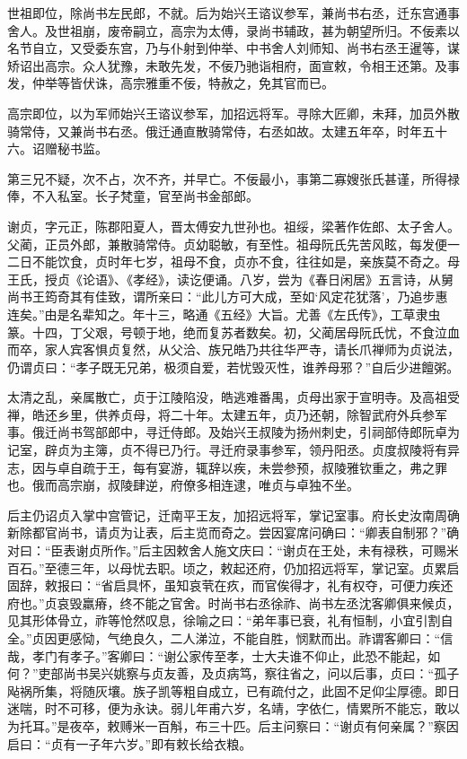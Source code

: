 \documentclass[]{article}
\begin{document}
世祖即位，除尚书左民郎，不就。后为始兴王谘议参军，兼尚书右丞，迁东宫通事舍人。及世祖崩，废帝嗣立，高宗为太傅，录尚书辅政，甚为朝望所归。不佞素以名节自立，又受委东宫，乃与仆射到仲举、中书舍人刘师知、尚书右丞王暹等，谋矫诏出高宗。众人犹豫，未敢先发，不佞乃驰诣相府，面宣敕，令相王还第。及事发，仲举等皆伏诛，高宗雅重不佞，特赦之，免其官而已。

高宗即位，以为军师始兴王谘议参军，加招远将军。寻除大匠卿，未拜，加员外散骑常侍，又兼尚书右丞。俄迁通直散骑常侍，右丞如故。太建五年卒，时年五十六。诏赠秘书监。

第三兄不疑，次不占，次不齐，并早亡。不佞最小，事第二寡嫂张氏甚谨，所得禄俸，不入私室。长子梵童，官至尚书金部郎。

谢贞，字元正，陈郡阳夏人，晋太傅安九世孙也。祖绥，梁著作佐郎、太子舍人。父蔺，正员外郎，兼散骑常侍。贞幼聪敏，有至性。祖母阮氏先苦风眩，每发便一二日不能饮食，贞时年七岁，祖母不食，贞亦不食，往往如是，亲族莫不奇之。母王氏，授贞《论语》、《孝经》，读讫便诵。八岁，尝为《春日闲居》五言诗，从舅尚书王筠奇其有佳致，谓所亲曰：``此儿方可大成，至如`风定花犹落'，乃追步惠连矣。''由是名辈知之。年十三，略通《五经》大旨。尤善《左氏传》，工草隶虫篆。十四，丁父艰，号顿于地，绝而复苏者数矣。初，父蔺居母阮氏忧，不食泣血而卒，家人宾客惧贞复然，从父洽、族兄皓乃共往华严寺，请长爪禅师为贞说法，仍谓贞曰：``孝子既无兄弟，极须自爱，若忧毁灭性，谁养母邪？''自后少进饘粥。

太清之乱，亲属散亡，贞于江陵陷没，皓逃难番禺，贞母出家于宣明寺。及高祖受禅，皓还乡里，供养贞母，将二十年。太建五年，贞乃还朝，除智武府外兵参军事。俄迁尚书驾部郎中，寻迁侍郎。及始兴王叔陵为扬州刺史，引祠部侍郎阮卓为记室，辟贞为主簿，贞不得已乃行。寻迁府录事参军，领丹阳丞。贞度叔陵将有异志，因与卓自疏于王，每有宴游，辄辞以疾，未尝参预，叔陵雅钦重之，弗之罪也。俄而高宗崩，叔陵肆逆，府僚多相连逮，唯贞与卓独不坐。

后主仍诏贞入掌中宫管记，迁南平王友，加招远将军，掌记室事。府长史汝南周确新除都官尚书，请贞为让表，后主览而奇之。尝因宴席问确曰：``卿表自制邪？''确对曰：``臣表谢贞所作。''后主因敕舍人施文庆曰：``谢贞在王处，未有禄秩，可赐米百石。''至德三年，以母忧去职。顷之，敕起还府，仍加招远将军，掌记室。贞累启固辞，敕报曰：``省启具怀，虽知哀茕在疚，而官俟得才，礼有权夺，可便力疾还府也。''贞哀毁羸瘠，终不能之官舍。时尚书右丞徐祚、尚书左丞沈客卿俱来候贞，见其形体骨立，祚等怆然叹息，徐喻之曰：``弟年事已衰，礼有恒制，小宜引割自全。''贞因更感恸，气绝良久，二人涕泣，不能自胜，悯默而出。祚谓客卿曰：``信哉，孝门有孝子。''客卿曰：``谢公家传至孝，士大夫谁不仰止，此恐不能起，如何？''吏部尚书吴兴姚察与贞友善，及贞病笃，察往省之，问以后事，贞曰：``孤子飐祸所集，将随灰壤。族子凯等粗自成立，已有疏付之，此固不足仰尘厚德。即日迷喘，时不可移，便为永诀。弱儿年甫六岁，名靖，字依仁，情累所不能忘，敢以为托耳。''是夜卒，敕赙米一百斛，布三十匹。后主问察曰：``谢贞有何亲属？''察因启曰：``贞有一子年六岁。''即有敕长给衣粮。
\end{document}
